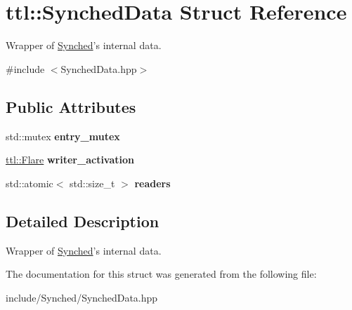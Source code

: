 \hypertarget{structttl_1_1_synched_data}{\section{ttl\-:\-:Synched\-Data Struct Reference}
\label{structttl_1_1_synched_data}
}


Wrapper of \hyperlink{classttl_1_1_synched}{Synched}'s internal data.  




{\ttfamily \#include $<$Synched\-Data.\-hpp$>$}

\subsection*{Public Attributes}
\begin{DoxyCompactItemize}
\item 
\hypertarget{structttl_1_1_synched_data_a4249f85d2eb682541bbbe5daa7f3c57d}{std\-::mutex {\bfseries entry\-\_\-mutex}}\label{structttl_1_1_synched_data_a4249f85d2eb682541bbbe5daa7f3c57d}

\item 
\hypertarget{structttl_1_1_synched_data_a1e643d3a430790684d17070b85e852c1}{\hyperlink{classttl_1_1_flare}{ttl\-::\-Flare} {\bfseries writer\-\_\-activation}}\label{structttl_1_1_synched_data_a1e643d3a430790684d17070b85e852c1}

\item 
\hypertarget{structttl_1_1_synched_data_a3192f4eedc52ac010cda73e6b072414a}{std\-::atomic$<$ std\-::size\-\_\-t $>$ {\bfseries readers}}\label{structttl_1_1_synched_data_a3192f4eedc52ac010cda73e6b072414a}

\end{DoxyCompactItemize}


\subsection{Detailed Description}
Wrapper of \hyperlink{classttl_1_1_synched}{Synched}'s internal data. 

The documentation for this struct was generated from the following file\-:\begin{DoxyCompactItemize}
\item 
include/\-Synched/Synched\-Data.\-hpp\end{DoxyCompactItemize}
